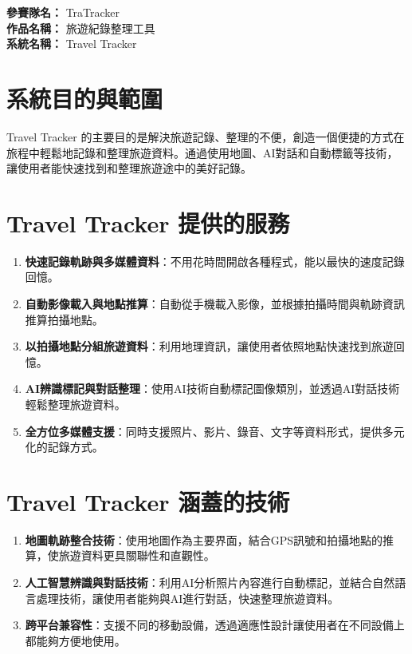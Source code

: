 \noindent
\textbf{參賽隊名：} TraTracker \\
\textbf{作品名稱：} 旅遊紀錄整理工具 \\
\textbf{系統名稱：} Travel Tracker

\section{系統目的與範圍}

Travel Tracker 的主要目的是解決旅遊記錄、整理的不便，創造一個便捷的方式在旅程中輕鬆地記錄和整理旅遊資料。通過使用地圖、AI對話和自動標籤等技術，讓使用者能快速找到和整理旅遊途中的美好記錄。

\section{Travel Tracker 提供的服務}
\begin{enumerate}
  \item \textbf{快速記錄軌跡與多媒體資料}：不用花時間開啟各種程式，能以最快的速度記錄回憶。
  \item \textbf{自動影像載入與地點推算}：自動從手機載入影像，並根據拍攝時間與軌跡資訊推算拍攝地點。
  \item \textbf{以拍攝地點分組旅遊資料}：利用地理資訊，讓使用者依照地點快速找到旅遊回憶。
  \item \textbf{AI辨識標記與對話整理}：使用AI技術自動標記圖像類別，並透過AI對話技術輕鬆整理旅遊資料。
  \item \textbf{全方位多媒體支援}：同時支援照片、影片、錄音、文字等資料形式，提供多元化的記錄方式。
\end{enumerate}

\section{Travel Tracker 涵蓋的技術}
\begin{enumerate}
  \item \textbf{地圖軌跡整合技術}：使用地圖作為主要界面，結合GPS訊號和拍攝地點的推算，使旅遊資料更具關聯性和直觀性。
  \item \textbf{人工智慧辨識與對話技術}：利用AI分析照片內容進行自動標記，並結合自然語言處理技術，讓使用者能夠與AI進行對話，快速整理旅遊資料。
  \item \textbf{跨平台兼容性}：支援不同的移動設備，透過適應性設計讓使用者在不同設備上都能夠方便地使用。
\end{enumerate}
